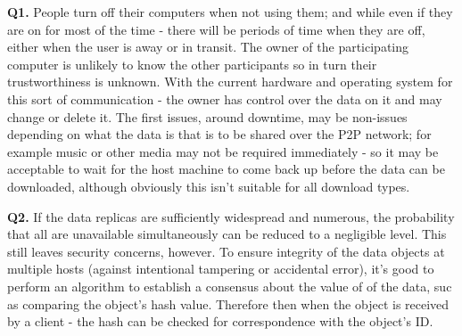 \textbf{Q1.} People turn off their computers when not using them; and while even if they are on for most of the time - there will be periods of time when they are off, either when the user is away or in transit. The owner of the participating computer is unlikely to know the other participants so in turn their trustworthiness is unknown. With the current hardware and operating system for this sort of communication - the owner has control over the data on it and may change or delete it. The first issues, around downtime, may be non-issues depending on what the data is that is to be shared over the P2P network; for example music or other media may not be required immediately - so it may be acceptable to wait for the host machine to come back up before the data can be downloaded, although obviously this isn't suitable for all download types.

\textbf{Q2.} If the data replicas are sufficiently widespread and numerous, the probability that all are unavailable simultaneously can be reduced to a negligible level. This still leaves security concerns, however. To ensure integrity of the data objects at multiple hosts (against intentional tampering or accidental error), it's good to perform an algorithm to establish a consensus about the value of of the data, suc as comparing the object's hash value. Therefore then when the object is received by a client - the hash can be checked for correspondence with the object's ID. 